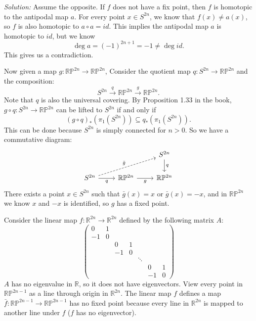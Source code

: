 \documentclass[a4paper, 12pt]{article}
\newenvironment{solution}
    {\textit{Solution:}}
    {}
\begin{document}
\begin{solution}
Assume the opposite. If \(f\) does not have a fix point, then \(f\) is homotopic to the antipodal map \(a\). For every point \(x\in S^{2n}\), we know that \(f(x)\neq a(x)\), so \(f\) is also homotopic to 
\(a\circ a=id\). This implies the antipodal map \(a\) is homotopic to \(id\), but we know 
\[\deg a=(-1)^{2n+1}=-1\neq \deg id.\]
This gives us a contradiction. 

Now given a map \(g:\mathbb{R}\mathbb{P}^{2n}\rightarrow \mathbb{R}\mathbb{P}^{2n}\), Consider the quotient map \(q:S^{2n}\rightarrow \mathbb{R}\mathbb{P}^{2n}\) and the composition:
\[S^{2n}\xrightarrow{q}\mathbb{R}\mathbb{P}^{2n}\xrightarrow{g}\mathbb{R}\mathbb{P}^{2n}.\]
Note that \(q\) is also the universal covering. By Proposition 1.33 in the book, \(g\circ q:S^{2n}\rightarrow \mathbb{R}\mathbb{P}^{2n}\) can be lifted to \(S^{2n}\) if and only if 
\[(g\circ q)_*(\pi_1(S^{2n}))\subseteq q_*(\pi_1(S^{2n})).\]
This can be done because \(S^{2n}\) is simply connected for \(n>0\). So we have a commutative diagram:
\[\begin{tikzcd}
	&& {S^{2n}} \\
	{S^{2n}} & {\mathbb{R}\mathbb{P}^{2n}} & {\mathbb{R}\mathbb{P}^{2n}}
	\arrow["q", from=1-3, to=2-3]
	\arrow["{\bar{g}}", dashed, from=2-1, to=1-3]
	\arrow["q"', from=2-1, to=2-2]
	\arrow["g"', from=2-2, to=2-3]
\end{tikzcd}\]
There exists a point \(x\in S^{2n}\) such that \(\bar{g}(x)=x\) or \(\bar{g}(x)=-x\), and in \(\mathbb{R}\mathbb{P}^{2n}\) we know \(x\) and \(-x\) is identified, so \(g\) has a fixed point.

Consider the linear map \(f:\mathbb{R}^{2n}\rightarrow \mathbb{R}^{2n}\) defined by the following matrix \(A\):
\[\begin{pmatrix}
    0 & 1 &  &  &  &  &  \\
    -1 & 0 &  &  &  &  &  \\
     &  & 0 & 1 &  &  &  \\
     &  & -1 & 0 &  &  &  \\
     &  &  &  & \ddots &  &  \\
     &  &  &  &  & 0 & 1 \\
     &  &  &  &  & -1 & 0 
    \end{pmatrix}\]
\(A\) has no eigenvalue in \(\mathbb{R}\), so it does not have eigenvectors. View every point in \(\mathbb{R}\mathbb{P}^{2n-1}\) as a line through origin in \(\mathbb{R}^{2n}\). The linear map \(f\) defines a map 
\(\bar{f}:\mathbb{R}\mathbb{P}^{2n-1}\rightarrow \mathbb{R}\mathbb{P}^{2n-1}\) has no fixed point because every line in \(\mathbb{R}^{2n}\) is mapped to another line under \(f\) (\(f\) has no eigenvector).
\end{solution}
\end{document}
